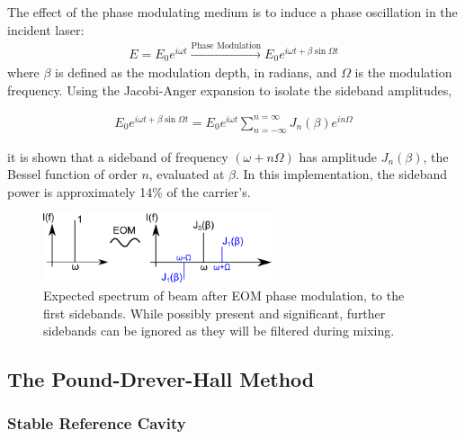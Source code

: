 The effect of the phase modulating medium is to induce a phase oscillation in the incident laser:
\begin{gather}
  E = E_0 e^{i\omega t} \xrightarrow{\mbox{Phase Modulation}}
    E_0 e^{i \omega t + \beta \sin \Omega t}
\end{gather}
where $\beta$ is defined as the modulation depth, in radians, and $\Omega$ is the modulation frequency. Using the Jacobi-Anger expansion to isolate the sideband amplitudes,

\begin{gather}
  E_0 e^{i \omega t + \beta \sin \Omega t}  =
  E_0 e^{i\omega t} \sum_{n = -\infty}^{n = \infty} J_n(\beta)e^{in\Omega}
\end{gather}

it is shown that a sideband of frequency $(\omega +n\Omega)$ has amplitude $J_n(\beta)$, the Bessel function of order $n$, evaluated at $\beta$. In this implementation, the sideband power is approximately 14\% of the carrier's.

\begin{figure}
  \centering
  \includegraphics[width=0.6\textwidth]{figures/spectrum.png}
  \caption{Expected spectrum of beam after EOM phase modulation, to the first
  sidebands. While possibly present and significant, further sidebands can
  be ignored as they will be filtered during mixing.}
  \label{fig:eom_spectrum}
\end{figure}


\subsection{The Pound-Drever-Hall Method}

\subsubsection{Stable Reference Cavity}


